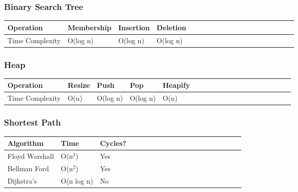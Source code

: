 \documentclass[11pt,oneside]{book}
\begin{document}
\subsubsection{Binary Search Tree}

\begin{center}\begin{tabulary}{0.4\linewidth}{|l|l|l|l|l|l|l|l|l|l|l|l|l|l|l|l|l|l|l}\hline


  Operation &
  Membership &
  Insertion &
  Deletion\\
\hline


  Time Complexity &
  O(log n) &
  O(log n) &
  O(log n)\\

\hline\end{tabulary}\end{center}

\subsubsection{Heap}

\begin{center}\begin{tabulary}{0.4\linewidth}{|l|l|l|l|l|l|l|l|l|l|l|l|l|l|l|l|l|l|l}\hline


  Operation &
  Resize &
  Push &
  Pop &
  Heapify\\
\hline


  Time Complexity &
  O(n) &
  O(log n) &
  O(log n) &
  O(n)\\

\hline\end{tabulary}\end{center}

\subsubsection{Shortest Path}

\begin{center}\begin{tabulary}{0.4\linewidth}{|l|l|l|l|l|l|l|l|l|l|l|l|l|l|l|l|l|l|l}\hline


  Algorithm &
  Time &
  Cycles?\\
\hline


  Floyd Warshall &
  O(n$^{3}$) &
  Yes\\

  Bellman Ford &
  O(n$^{2}$) &
  Yes\\

  Dijkstra's &
  O(n log n) &
  No\\

\hline\end{tabulary}\end{center}

  \newpage\null\thispagestyle{empty}\newpage
\end{document}
